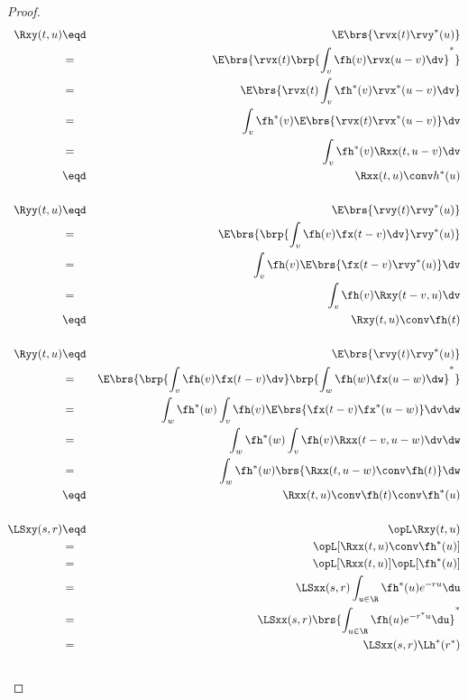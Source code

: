 \begin{proof}
\begin{eqnarray*}
   \Rxy(t,u)
     &\eqd& \E\brs{\rvx(t) \rvy^\ast(u) }
   \\&=&    \E\brs{\rvx(t) \brp{ \int_v \fh(v) \rvx(u-v)  \dv }^\ast }
   \\&=&    \E\brs{\rvx(t) \int_v \fh^\ast(v) \rvx^\ast(u-v)  \dv }
   \\&=&    \int_v \fh^\ast(v)  \E\brs{\rvx(t)\rvx^\ast(u-v)} \dv
   \\&=&    \int_v \fh^\ast(v)  \Rxx(t,u-v)  \dv
   \\&\eqd& \Rxx(t,u) \conv h^\ast(u)
\\ \\
   \Ryy(t,u)
     &\eqd& \E\brs{\rvy(t) \rvy^\ast(u) }
   \\&=&    \E\brs{\brp{\int_v \fh(v) \fx(t-v)\dv}  \rvy^\ast(u) }
   \\&=&    \int_v \fh(v) \E\brs{\fx(t-v)\rvy^\ast(u)} \dv
   \\&=&    \int_v \fh(v) \Rxy(t-v,u) \dv
   \\&\eqd& \Rxy(t,u) \conv \fh(t)
\\ \\
   \Ryy(t,u)
     &\eqd& \E\brs{\rvy(t) \rvy^\ast(u) }
   \\&=&    \E\brs{\brp{\int_v \fh(v) \fx(t-v)\dv}
                    \brp{\int_w \fh(w) \fx(u-w)\dw}^\ast
              }
   \\&=&    \int_w \fh^\ast(w) \int_v \fh(v)
                   \E\brs{\fx(t-v)\fx^\ast(u-w)} \dv\dw
   \\&=&    \int_w \fh^\ast(w) \int_v \fh(v)
                   \Rxx(t-v,u-w) \dv\dw
   \\&=&    \int_w \fh^\ast(w) \brs{\Rxx(t,u-w)\conv\fh(t)}\dw
   \\&\eqd& \Rxx(t,u) \conv \fh(t) \conv \fh^\ast(u)
\\ \\
   \LSxy(s,r)
     &\eqd& \opL\Rxy(t,u)
   \\&=&    \opL[\Rxx(t,u) \conv \fh^\ast(u)]
   \\&=&    \opL[\Rxx(t,u)]\opL[\fh^\ast(u)]
   \\&=&    \LSxx(s,r)  \int_{u\in\R}\fh^\ast(u) e^{-ru}\du
   \\&=&    \LSxx(s,r)  \brs{\int_{u\in\R}\fh(u) e^{-r^\ast u}\du }^\ast
   \\&=&    \LSxx(s,r) \Lh^\ast(r^\ast)
\\ \\

\end{eqnarray*}
\end{proof}
